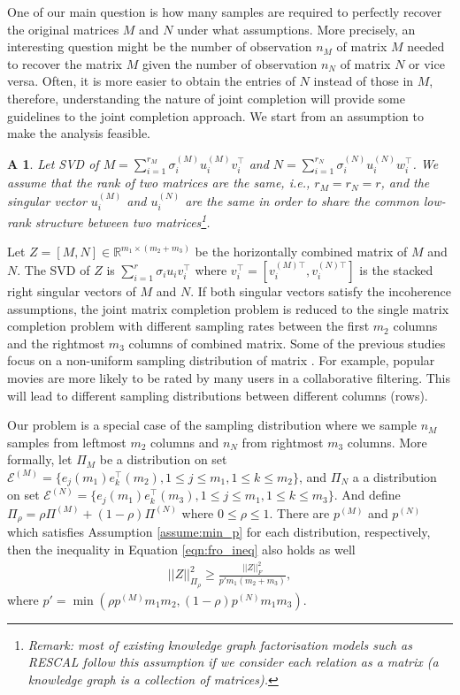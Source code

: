 \documentclass{article} %
\newtheorem{assumption}{A}
\begin{document}
One of our main question is how many samples are required to perfectly recover the original matrices $M$ and $N$ under what assumptions. More precisely, an interesting question might be the number of observation $n_M$ of matrix $M$ needed to recover the matrix $M$ given the number of observation $n_N$ of matrix $N$ or vice versa. Often, it is more easier to obtain the entries of $N$ instead of those in $M$, therefore, understanding the nature of joint completion will provide some guidelines to the joint completion approach. We start from an assumption to make the analysis feasible.

\begin{assumption}\label{assume:share}
Let SVD of $M = \sum_{i=1}^{r_M} \sigma_i^{(M)} u_i^{(M)} v_i^\top$ and $N = \sum_{i=1}^{r_N} \sigma_i^{(N)} u_i^{(N)} w_i^\top$. We assume that the rank of two matrices are the same, i.e., $r_M = r_N = r$, and the singular vector $u_i^{(M)}$ and $u_i^{(N)}$ are the same in order to share the common low-rank structure between two matrices\footnote{Remark: most of existing knowledge graph factorisation models such as RESCAL follow this assumption if we consider each relation as a matrix (a knowledge graph is a collection of matrices).}.
\end{assumption}

Let $Z = [M, N] \in \mathbb{R}^{m_1 \times (m_2+m_3)}$ be the horizontally combined matrix of $M$ and $N$. The SVD of $Z$ is $\sum_{i=1}^{r}\sigma_i u_i v_i^\top$ where $v_i^\top = [v_i^{(M)\top}, v_i^{(N)\top}]$ is the stacked right singular vectors of $M$ and $N$. If both singular vectors satisfy the incoherence assumptions, the joint matrix completion problem is reduced to the single matrix completion problem with different sampling rates between the first $m_2$ columns and the rightmost $m_3$ columns of combined matrix. Some of the previous studies focus on a non-uniform sampling distribution of matrix \cite{foygel2011learning,lounici2011optimal,negahban2012restricted,klopp2014noisy}. For example, popular movies are more likely to be rated by many users in a collaborative filtering. This will lead to different sampling distributions between different columns (rows). 

Our problem is a special case of the sampling distribution where we sample $n_M$ samples from leftmost $m_2$ columns and $n_N$ from rightmost $m_3$ columns. More formally, let $\Pi_M$ be a distribution on set $\mathcal{E}^{(M)} = \{e_j(m_1)e_k^\top(m_2), 1\leq j \leq m_1, 1\leq k \leq m_2 \}$, and $\Pi_N$ a a distribution on set $\mathcal{E}^{(N)} = \{e_j(m_1)e_k^\top(m_3), 1\leq j \leq m_1, 1\leq k \leq m_3 \}$. And define $\Pi_\rho = \rho \Pi^{(M)} + (1-\rho) \Pi^{(N)}$ where $0 \leq \rho \leq 1$. %
There are $p^{(M)}$ and $p^{(N)}$ which satisfies Assumption \ref{assume:min_p} for each distribution, respectively, then the inequality in Equation \ref{eqn:fro_ineq} also holds as well
\begin{align}
||Z||_{\Pi_\rho}^2 \geq \frac{||Z||_F^2}{p'm_1(m_2+m_3)},
\end{align}
where $p' = \min(\rho p^{(M)}m_1m_2, (1-\rho) p^{(N)}m_1m_3)$.
\end{document}
